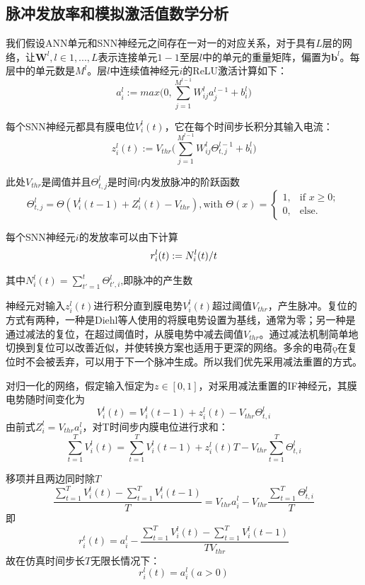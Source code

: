 \subsection{脉冲发放率和模拟激活值数学分析}
\par
我们假设ANN单元和SNN神经元之间存在一对一的对应关系，对于具有$L$层的网络，让$\mathbf{W}^l,l \in {1,...,L}$表示连接单元$1-1$至层$l$中的单元的重量矩阵，偏置为$\mathbf{b}^l$。每层中的单元数是$M^l$。层$l$中连续值神经元$i$的ReLU激活计算如下：
\[
a_i^l:= max \Biggl(0,\sum\limits_{j=1}^{M^{l-1}}W_{ij}^la_j^{l-1} + b_i^l \Biggr)
\]\par
每个SNN神经元都具有膜电位$V_i^l(t)$，它在每个时间步长积分其输入电流：
\[
z_i^l(t):= V_{thr} \Biggl(\sum\limits_{j=1}^{M^{l-1}}W_{ij}^l\Theta_{t,j}^{l-1} + b_i^l \Biggr)
\]\par
此处$V_{thr}$是阈值并且$\Theta_{t,j}^{l}$是时间$t$内发放脉冲的阶跃函数
\begin{equation}
	\Theta_{t,j}^{l}= \Theta(V_i^l(t-1) + Z_i^l(t) - V_{thr}),\text{with }
	\Theta(x) = 
	\begin{cases}
		1, & \text{if } x \ge 0; \\
		0, & \text{else.}
	\end{cases}
\end{equation} \par
每个SNN神经元$i$的发放率可以由下计算
\[
\setlength\abovedisplayskip{1pt}
\setlength\belowdisplayskip{1pt}
r_i^l(t):=N_i^l(t)/t
\]\par
其中$N_i^l(t)=\sum_{t'=1}^t\Theta_{t',i}^l$,即脉冲的产生数\par
神经元对输入$z_i^l(t)$进行积分直到膜电势$V_i^l(t)$超过阈值$V_{thr}$，产生脉冲。复位的方式有两种，一种是Diehl等人使用的将膜电势设置为基线，通常为零；另一种是通过减法的复位，在超过阈值时，从膜电势中减去阈值$V_{thr}$。通过减法机制简单地切换到复位可以改善近似，并使转换方案也适用于更深的网络。多余的电荷ǫ在复位时不会被丢弃，可以用于下一个脉冲生成。所以我们优先采用减法重置的方式。\par
对归一化的网络，假定输入恒定为$z \in [0,1]$，对采用减法重置的IF神经元，其膜电势随时间变化为
\[
V_i^l(t) = V_i^l(t-1) + z_i^l(t) -V_{thr}\Theta_{t,i}^l
\]
由前式$Z_i^l = V_{thr}a_i^l$，对T时间步内膜电位进行求和：
\[
\sum\limits_{t=1}^T V_i^l(t) = \sum\limits_{t=1}^T V_i^l(t-1) + z_i^l(t)T - V_{thr}\sum\limits_{t=1}^T\Theta_{t,i}^l
\]\par
移项并且两边同时除$T$
\[
\frac{\sum\limits_{t=1}^T V_i^l(t)-\sum\limits_{t=1}^T V_i^l(t-1)}T = V_{thr}a_i^l - V_{thr}\frac{\sum\limits_{t=1}^T\Theta_{t,i}^l}T
\]
即
\[
r_i^t(t)=a_i^l-\frac{\sum\limits_{t=1}^T V_i^l(t)-\sum\limits_{t=1}^T V_i^l(t-1)}{TV_{thr}}
\]
故在仿真时间步长$T$无限长情况下：
\[
r_i^l(t) = a_i^l(a > 0)
\]
